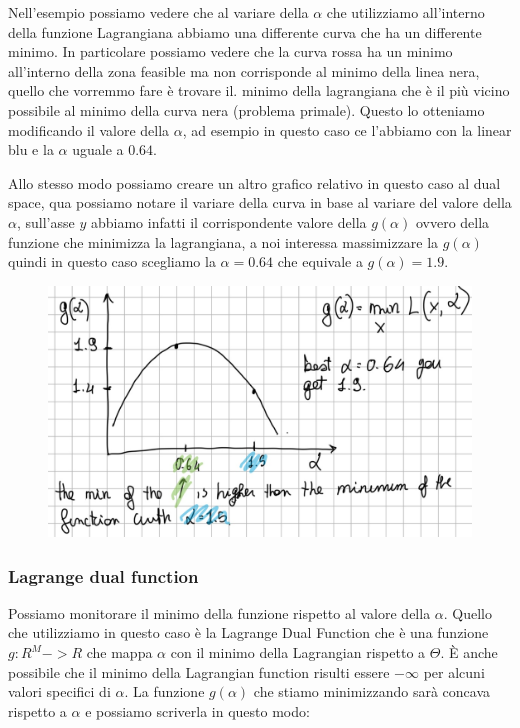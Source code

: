 \documentclass[14pt]{extreport}
\begin{document}
Nell'esempio possiamo vedere che al variare della $\alpha$ che utilizziamo all'interno della funzione Lagrangiana abbiamo una differente curva che ha
un differente minimo. In particolare possiamo vedere che la curva rossa ha un minimo all'interno della zona feasible ma non corrisponde al minimo
della linea nera, quello che vorremmo fare è trovare il. minimo della lagrangiana che è il più vicino possibile al minimo della curva nera (problema
primale). Questo lo otteniamo modificando il valore della $\alpha$, ad esempio in questo caso ce l'abbiamo con la linear blu e la $\alpha$ uguale a
$0.64$.

Allo stesso modo possiamo creare un altro grafico relativo in questo caso al dual space, qua possiamo notare il variare della curva in base al variare
del valore della $\alpha$, sull'asse $y$ abbiamo infatti il corrispondente valore della $g(\alpha)$ ovvero della funzione che minimizza la
lagrangiana, a noi interessa massimizzare la $g(\alpha)$ quindi in questo caso scegliamo la $\alpha = 0.64$ che equivale a $g(\alpha) = 1.9$.

\begin{figure}[H]
	\centering
	\includegraphics[width=0.7\linewidth]{307.jpeg}
\end{figure}

\subsubsection{Lagrange dual function}

Possiamo monitorare il minimo della funzione rispetto al valore della $\alpha$. Quello che utilizziamo in questo caso è la Lagrange Dual Function che
è una funzione $g: R^M->R$ che mappa $\alpha$ con il minimo della Lagrangian rispetto a $\Theta$. È anche possibile che il minimo della Lagrangian
function risulti essere $-\infty$ per alcuni valori specifici di $\alpha$. La funzione $g(\alpha)$ che stiamo minimizzando sarà concava rispetto a
$\alpha$ e possiamo scriverla in questo modo:
\end{document}
